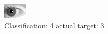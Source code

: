 \begin{figure}[h!]
\begin{center}
\includegraphics[width=0.60\columnwidth]{figures/ID213_class_4_target_3.png}
\end{center}
\caption{ Classification: 4 actual target: 3}
\label{fig:ID213_class_4_target_3}
\end{figure}
